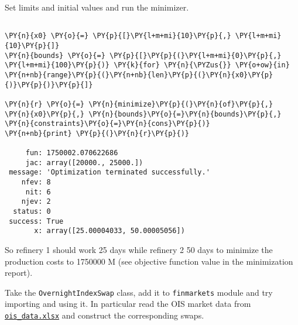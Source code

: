 \begin{Answer}
Set limits and initial values and run the minimizer.
\begin{codebox}[breakable, size=fbox, boxrule=1pt, pad at break*=1mm,colback=cellbackground, colframe=cellborder]
\begin{Verbatim}[commandchars=\\\{\}]
        
\PY{n}{x0} \PY{o}{=} \PY{p}{[}\PY{l+m+mi}{10}\PY{p}{,} \PY{l+m+mi}{10}\PY{p}{]}
\PY{n}{bounds} \PY{o}{=} \PY{p}{[}\PY{p}{(}\PY{l+m+mi}{0}\PY{p}{,} \PY{l+m+mi}{100}\PY{p}{)} \PY{k}{for} \PY{n}{\PYZus{}} \PY{o+ow}{in} \PY{n+nb}{range}\PY{p}{(}\PY{n+nb}{len}\PY{p}{(}\PY{n}{x0}\PY{p}{)}\PY{p}{)}\PY{p}{]}

\PY{n}{r} \PY{o}{=} \PY{n}{minimize}\PY{p}{(}\PY{n}{of}\PY{p}{,} \PY{n}{x0}\PY{p}{,} \PY{n}{bounds}\PY{o}{=}\PY{n}{bounds}\PY{p}{,} \PY{n}{constraints}\PY{o}{=}\PY{n}{cons}\PY{p}{)}
\PY{n+nb}{print} \PY{p}{(}\PY{n}{r}\PY{p}{)}

     fun: 1750002.070622686
     jac: array([20000., 25000.])
 message: 'Optimization terminated successfully.'
    nfev: 8
     nit: 6
    njev: 2
  status: 0
 success: True
       x: array([25.00004033, 50.00005056])
    \end{Verbatim}
\end{codebox}
    
 So refinery 1 should work 25 days while refinery 2 50 days to minimize the production costs to 1750000 M (see objective function value in the minimization report).
\end{Answer}

\begin{Exercise}[title={(OvernightIndexSwap)}]
Take the \texttt{OvernightIndexSwap} class, add it to \texttt{finmarkets} module and try importing and using it. In particular read the OIS market data from \href{https://drive.google.com/file/d/1LCEDmheKqwPXFpJ25hFz32QI5im2UJO1/view?usp=sharing}{\texttt{ois\_data.xlsx}} and construct the corresponding swaps.
\end{Exercise}

